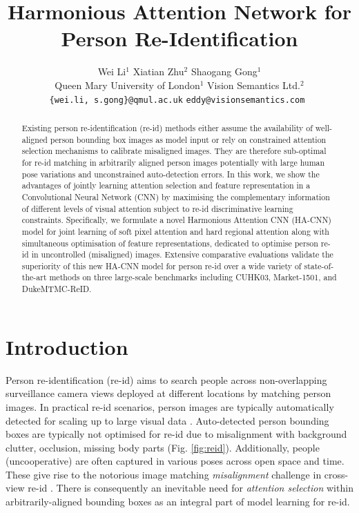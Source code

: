 \documentclass[10pt,twocolumn,letterpaper]{article}
\begin{document}
\title{Harmonious Attention Network for Person Re-Identification}
\author{Wei Li$^1$ 
	\quad \quad  \quad \quad  \quad Xiatian Zhu$^2$ 
	 \quad \quad \quad \quad \quad  Shaogang Gong$^1$ \\
Queen Mary University of London$^1$ \quad \quad \quad \quad Vision Semantics Ltd.$^2$\\
{\tt\small \{wei.li, s.gong\}@qmul.ac.uk} 
\quad \quad 
\tt\small eddy@visionsemantics.com
}

\maketitle




\begin{abstract}
	
Existing person re-identification (re-id) methods 
either assume the availability of well-aligned person bounding box images as model input
or rely on constrained attention selection mechanisms to calibrate misaligned images.
They are therefore sub-optimal for re-id matching in arbitrarily
aligned person images potentially with large human pose variations and 
unconstrained auto-detection errors.
In this work, we show the
advantages of jointly learning attention selection and feature representation
in a Convolutional Neural Network (CNN) by 
maximising the complementary information of different levels of visual
attention subject
to re-id discriminative learning constraints. 
Specifically, we
formulate a novel Harmonious Attention CNN (HA-CNN) model for 
joint learning of soft pixel attention and hard regional attention
along with simultaneous optimisation of feature representations, 
dedicated to optimise person re-id in uncontrolled (misaligned) images.
Extensive comparative evaluations validate the superiority of this new
HA-CNN model for person re-id over a wide variety of
state-of-the-art methods on three large-scale benchmarks
including CUHK03, Market-1501, and DukeMTMC-ReID. 	

\end{abstract}

\section{Introduction}
Person re-identification (re-id) aims to search people across non-overlapping surveillance camera views deployed at different locations by matching person images.
In practical re-id scenarios, 
person images are typically automatically detected for scaling up to
large visual data \cite{zheng2015scalable,li2014deepreid}.
Auto-detected person bounding boxes are typically not optimised for re-id 
due to misalignment with background clutter, occlusion, missing body parts
(Fig. \ref{fig:reid}). 
Additionally, people ({uncooperative)} are often captured in various poses across open space and time.
These give rise to the notorious image matching {\em misalignment} challenge
in cross-view re-id \cite{gong2014person}.
There is consequently an inevitable need for {\em attention selection} 
within arbitrarily-aligned bounding boxes 
as an integral part of model learning for re-id.
\end{document}
